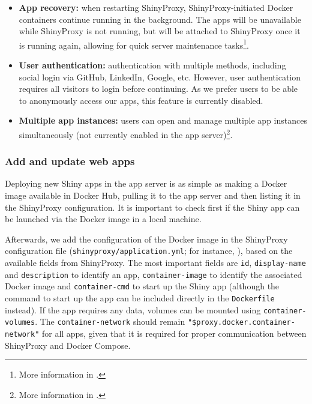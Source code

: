 \begin{itemize}
    \item \textbf{App recovery:} when restarting ShinyProxy, ShinyProxy-initiated Docker containers continue running in the background. The apps will be unavailable while ShinyProxy is not running, but will be attached to ShinyProxy once it is running again, allowing for quick server maintenance tasks\footnote{More information in .}.
    \item \textbf{User authentication:} authentication with multiple methods, including social login via GitHub, LinkedIn, Google, etc. However, user authentication requires all visitors to login before continuing. As we prefer users to be able to anonymously access our apps, this feature is currently disabled.
	\item \textbf{Multiple app instances:} users can open and manage multiple app instances simultaneously (not currently enabled in the app server)\footnote{More information in .}.
\end{itemize}

\subsubsection{Add and update web apps}

Deploying new Shiny apps in the app server is as simple as making a Docker image available in Docker Hub, pulling it to the app server and then listing it in the ShinyProxy configuration. It is important to check first if the Shiny app can be launched via the Docker image in a local machine.

Afterwards, we add the configuration of the Docker image in the ShinyProxy configuration file (\texttt{shinyproxy/application.yml}; for instance, ), based on the available fields from ShinyProxy. The most important fields are \texttt{id}, \texttt{display-name} and \texttt{description} to identify an app, \texttt{container-image} to identify the associated Docker image and \texttt{container-cmd} to start up the Shiny app (although the command to start up the app can be included directly in the \texttt{Dockerfile} instead). If the app requires any data, volumes can be mounted using \texttt{container-volumes}. The \texttt{container-network} should remain \texttt{"\${proxy.docker.container-network}"} for all apps, given that it is required for proper communication between ShinyProxy and Docker Compose.

